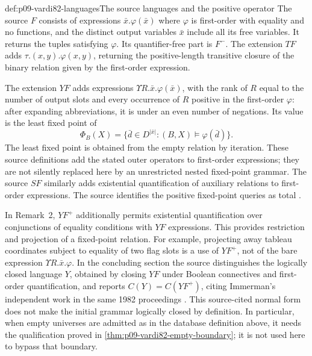 \begin{hbdefinition}{def:p09-vardi82-languages}{The source languages and the positive operator}
The source \(F\) consists of expressions \(\bar x.\varphi(\bar x)\)
where \(\varphi\) is first-order with equality and no functions, and the
distinct output variables \(\bar x\) include all its free variables.
It returns the tuples satisfying \(\varphi\).  Its quantifier-free part is
\(F^-\).  The extension \(TF\) adds
\(\tau.(x,y).\varphi(x,y)\), returning the positive-length transitive
closure of the binary relation given by the first-order expression.

The extension \(YF\) adds expressions
\(\Upsilon R.\bar x.\varphi(\bar x)\), with the rank of \(R\) equal
to the number of output slots and every occurrence of \(R\) positive in
the first-order \(\varphi\): after expanding abbreviations, it is under
an even number of negations.  Its value is the least fixed point of
\[
 \Phi_B(X)=\{\bar d\in D^{\lvert\bar x\rvert}:
                    (B,X)\models\varphi(\bar d)\}.
\]
The least fixed point is obtained from the empty relation by iteration.
These source definitions add the stated outer operators to first-order
expressions; they are not silently replaced here by an unrestricted nested
fixed-point grammar.  The source \(SF\) similarly adds existential
quantification of auxiliary relations to first-order expressions.
The source identifies the positive fixed-point queries as total
\cite[pp.~139--140]{Vardi1982}.

In Remark~2, \(YF^+\) additionally permits existential quantification over
conjunctions of equality conditions with \(YF\) expressions.  This provides
restriction and projection of a fixed-point relation.  For example, projecting
away tableau coordinates subject to equality of two flag slots is a use of
\(YF^+\), not of the bare expression \(\Upsilon R.\bar x.\varphi\).
In the concluding section the source distinguishes the logically closed
language \(Y\), obtained by closing \(YF\) under Boolean connectives and
first-order quantification, and reports \(C(Y)=C(YF^+)\), citing Immerman's
independent work in the same 1982 proceedings \cite[p.~145]{Vardi1982}.
This source-cited normal form does not make the initial grammar logically
closed by definition. In particular, when empty universes are admitted as
in the database definition above, it needs the qualification proved in
\cref{thm:p09-vardi82-empty-boundary}; it is not used here to bypass that
boundary.
\end{hbdefinition}

